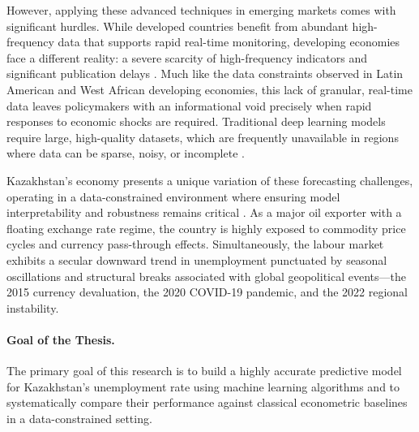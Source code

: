 \documentclass[14pt, a4paper]{extarticle}
\begin{document}
However, applying these advanced techniques in emerging markets comes with significant hurdles. While developed countries benefit from abundant high-frequency data that supports rapid real-time monitoring, developing economies face a different reality: a severe scarcity of high-frequency indicators and significant publication delays \cite{bolivar2026}. Much like the data constraints observed in Latin American \cite{bolivar2026} and West African \cite{mati2024} developing economies, this lack of granular, real-time data leaves policymakers with an informational void precisely when rapid responses to economic shocks are required. Traditional deep learning models require large, high-quality datasets, which are frequently unavailable in regions where data can be sparse, noisy, or incomplete \cite{mati2024}.

Kazakhstan's economy presents a unique variation of these forecasting challenges, operating in a data-constrained environment where ensuring model interpretability and robustness remains critical \cite{adilkhanova2024}. As a major oil exporter with a floating exchange rate regime, the country is highly exposed to commodity price cycles and currency pass-through effects. Simultaneously, the labour market exhibits a secular downward trend in unemployment punctuated by seasonal oscillations and structural breaks associated with global geopolitical events---the 2015 currency devaluation, the 2020 COVID-19 pandemic, and the 2022 regional instability.

\paragraph{Goal of the Thesis.}
The primary goal of this research is to build a highly accurate predictive model for Kazakhstan's unemployment rate using machine learning algorithms and to systematically compare their performance against classical econometric baselines in a data-constrained setting.
\end{document}
